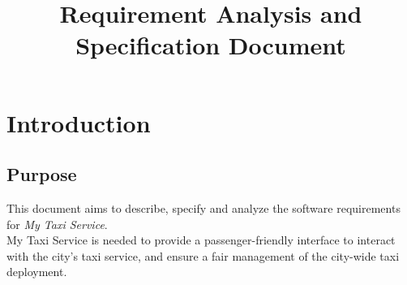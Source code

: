 \documentclass[a4paper,11pt]{report}
\title{Requirement Analysis and Specification Document}
\author{}
\begin{document}
\maketitle
\tableofcontents

\chapter*{Introduction}
\addtocounter{chapter}{1}

\section{Purpose}
This document aims to describe, specify and analyze the software requirements for \textit{My Taxi Service}. \\
My Taxi Service is needed to provide a passenger-friendly interface to interact with the city's taxi service, and ensure
a fair management of the city-wide taxi deployment.
\end{document}

